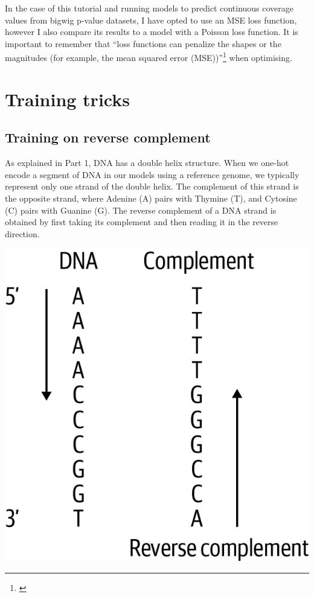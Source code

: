 \documentclass[
]{book}
\begin{document}
In the case of this tutorial and running models to predict continuous coverage values from bigwig p-value datasets, I have opted to use an MSE loss function, however I also compare its results to a model with a Poisson loss function. It is important to remember that ``loss functions can penalize the shapes or the magnitudes (for example, the mean squared error (MSE))''\footnote{\citet{toneyan2022}} when optimising.

\chapter{Training tricks}\label{training-tricks}

\section{Training on reverse complement}\label{training-on-reverse-complement}

As explained in Part 1, DNA has a double helix structure. When we one-hot encode a segment of DNA in our models using a reference genome, we typically represent only one strand of the double helix. The complement of this strand is the opposite strand, where Adenine (A) pairs with Thymine (T), and Cytosine (C) pairs with Guanine (G). The reverse complement of a DNA strand is obtained by first taking its complement and then reading it in the reverse direction.

\includegraphics{images/reverse_complement.png}
\end{document}
